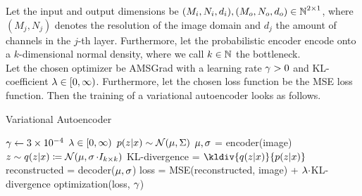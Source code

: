 \begin{algorithm}
Let the input and output dimensions be $(M_i,N_i, d_i), (M_o,N_o,d_o) \in \operatorname{\mathbb{N}}^{2\times 1}$, where $(M_j, N_j)$ denotes the resolution of the image domain and $d_j$ the amount of channels in the $j$-th layer. Furthermore, let the probabilistic encoder encode onto a $k$-dimensional normal density, where we call $k\in\operatorname{\mathbb{N}}$ the bottleneck.\\
Let the chosen optimizer be AMSGrad with a learning rate $\operatorname{\gamma}>0$ and KL-coefficient $\lambda\in[0,\infty)$. Furthermore, let the chosen loss function be the MSE loss function. Then the training of a variational autoencoder looks as follows.
\caption{Variational Autoencoder}\label{alg:general_vae}
\begin{algorithmic}[1]
\Require $\operatorname{\gamma} \gets \num{3e-4}$ 
\Require $\lambda \in [0,\infty)$ 
\Require $p(z|x) \sim \mathcal{N}(\operatorname{\mu},\Sigma)$ 
	    \State $\operatorname{\mu}, \operatorname{\sigma}$ = encoder(image) 
	    \State $z\sim q(z|x) \coloneqq\mathcal{N}(\operatorname{\mu}, \operatorname{\sigma}\cdot I_{k\times k})$ 
    	\State KL-divergence = $\kldiv{q(z|x)}{p(z|x)}$ 
		\State reconstructed = decoder($\operatorname{\mu}, \operatorname{\sigma}$) 
    	\State loss = MSE(reconstructed, image) + $\lambda\cdot$KL-divergence 
	    \State optimization(loss, $\operatorname{\gamma}$) 
    \EndFor
\EndFor
\end{algorithmic}
\end{algorithm}

